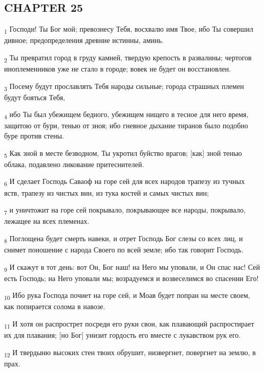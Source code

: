 \subsection{CHAPTER 25}
\begin{tcolorbox}
\textsubscript{1} Господи! Ты Бог мой; превознесу Тебя, восхвалю имя Твое, ибо Ты совершил дивное; предопределения древние истинны, аминь.
\end{tcolorbox}
\begin{tcolorbox}
\textsubscript{2} Ты превратил город в груду камней, твердую крепость в развалины; чертогов иноплеменников уже не стало в городе; вовек не будет он восстановлен.
\end{tcolorbox}
\begin{tcolorbox}
\textsubscript{3} Посему будут прославлять Тебя народы сильные; города страшных племен будут бояться Тебя,
\end{tcolorbox}
\begin{tcolorbox}
\textsubscript{4} ибо Ты был убежищем бедного, убежищем нищего в тесное для него время, защитою от бури, тенью от зноя; ибо гневное дыхание тиранов было подобно буре против стены.
\end{tcolorbox}
\begin{tcolorbox}
\textsubscript{5} Как зной в месте безводном, Ты укротил буйство врагов; [как] зной тенью облака, подавлено ликование притеснителей.
\end{tcolorbox}
\begin{tcolorbox}
\textsubscript{6} И сделает Господь Саваоф на горе сей для всех народов трапезу из тучных яств, трапезу из чистых вин, из тука костей и самых чистых вин;
\end{tcolorbox}
\begin{tcolorbox}
\textsubscript{7} и уничтожит на горе сей покрывало, покрывающее все народы, покрывало, лежащее на всех племенах.
\end{tcolorbox}
\begin{tcolorbox}
\textsubscript{8} Поглощена будет смерть навеки, и отрет Господь Бог слезы со всех лиц, и снимет поношение с народа Своего по всей земле; ибо так говорит Господь.
\end{tcolorbox}
\begin{tcolorbox}
\textsubscript{9} И скажут в тот день: вот Он, Бог наш! на Него мы уповали, и Он спас нас! Сей есть Господь; на Него уповали мы; возрадуемся и возвеселимся во спасении Его!
\end{tcolorbox}
\begin{tcolorbox}
\textsubscript{10} Ибо рука Господа почиет на горе сей, и Моав будет попран на месте своем, как попирается солома в навозе.
\end{tcolorbox}
\begin{tcolorbox}
\textsubscript{11} И хотя он распрострет посреди его руки свои, как плавающий распростирает их для плавания; [но Бог] унизит гордость его вместе с лукавством рук его.
\end{tcolorbox}
\begin{tcolorbox}
\textsubscript{12} И твердыню высоких стен твоих обрушит, низвергнет, повергнет на землю, в прах.
\end{tcolorbox}
